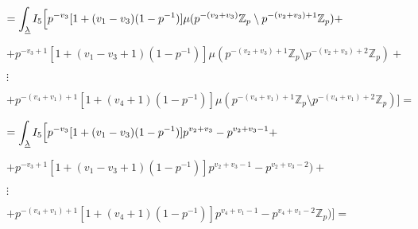 \documentclass{article}
\begin{document}
$=\displaystyle\int_{\underline\lambda}I_{5}\Bigl[p^{-v_{3}}[1+(v_1-v_3)(1-p^{-1})]\mu(p^{-(v_{2}+v_3)}\mathbb{Z}_{p}\setminus{p^{-(v_{2}+v_3)+1}\mathbb{Z}_{p}})+$

$+p^{-v_{3}+1}[1+(v_1-v_3+1)(1-p^{-1})]\mu(p^{-(v_{2}+v_3)+1}\mathbb{Z}_{p}\setminus{p^{-(v_{2}+v_3)+2}\mathbb{Z}_{p}})+$

$\vdots$

$+p^{-(v_{4}+v_1)+1}[1+(v_4+1)(1-p^{-1})]\mu(p^{-(v_{4}+v_1)+1}\mathbb{Z}_{p}\setminus{p^{-(v_{4}+v_1)+2}\mathbb{Z}_{p}})\Bigr]=$

$=\displaystyle\int_{\underline\lambda}I_{5}\Bigl[p^{-v_{3}}[1+(v_1-v_3)(1-p^{-1})]p^{v_{2}+v_3}-p^{v_{2}+v_3-1}+$

$+p^{-v_{3}+1}[1+(v_1-v_3+1)(1-p^{-1})]p^{v_{2}+v_3-1}-p^{v_{2}+v_3-2})+$

$\vdots$

$+p^{-(v_{4}+v_1)+1}[1+(v_4+1)(1-p^{-1})]p^{v_{4}+v_1-1}-p^{v_{4}+v_1-2}\mathbb{Z}_{p})\Bigr]=$
\end{document}
